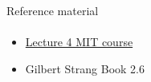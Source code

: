 \documentclass[aspectratio=169]{beamer}
\newcommand{\fbckg}[1]{\usebackgroundtemplate{\texttt{[image: \#1]}}}%
\begin{document}
\begin{frame}[t]{Reference material}
\framesubtitle{}
\Large
    \begin{itemize}
        \item \href{https://ocw.mit.edu/courses/mathematics/18-06-linear-algebra-spring-2010/video-lectures/lecture-4-factorization-into-a-lu/}{Lecture 4 MIT course}
        \item Gilbert Strang Book 2.6
    \end{itemize}
\end{frame}

\fbckg{fibeamer/figs/last_page.png}
\frame[plain]{}
\end{document}
